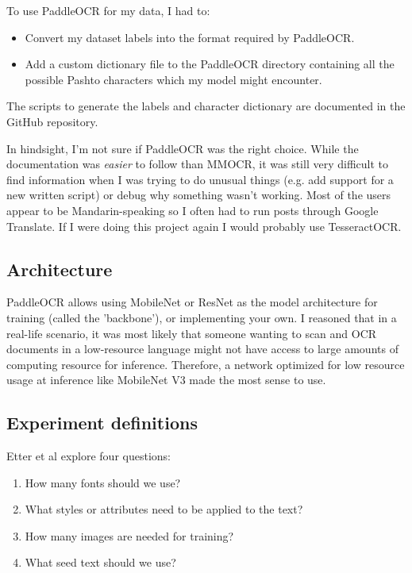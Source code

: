 \documentclass[twocolumn,11pt]{extarticle}
\begin{document}
\noindent To use PaddleOCR for my data, I had to:
\begin{itemize}
    \item Convert my dataset labels into the format required by PaddleOCR.
    \item Add a custom dictionary file to the PaddleOCR directory containing all the possible Pashto characters which my model might encounter. 
\end{itemize}

The scripts to generate the labels and character dictionary are documented in the GitHub repository. 

In hindsight, I'm not sure if PaddleOCR was the right choice. While the documentation was \textit{easier} to follow than MMOCR, it was still very difficult to find information when I was trying to do unusual things (e.g. add support for a new written script) or debug why something wasn't working. Most of the users appear to be Mandarin-speaking so I often had to run posts through Google Translate. If I were doing this project again I would probably use TesseractOCR. 

\subsection{Architecture}

PaddleOCR allows using MobileNet \cite{howard_mobilenets_2017} or ResNet \cite{he_deep_2016} as the model architecture for training (called the 'backbone'), or implementing your own. I reasoned that in a real-life scenario, it was most likely that someone wanting to scan and OCR documents in a low-resource language might not have access to large amounts of computing resource for inference. Therefore, a network optimized for low resource usage at inference like MobileNet V3 \cite{howard_searching_2019} made the most sense to use.

\subsection{Experiment definitions}
Etter et al explore four questions:
\begin{enumerate}
    \item How many fonts should we use?
    \item What styles or attributes need to be applied to the text?
    \item How many images are needed for training?
    \item What seed text should we use? 
\end{enumerate}
\end{document}
